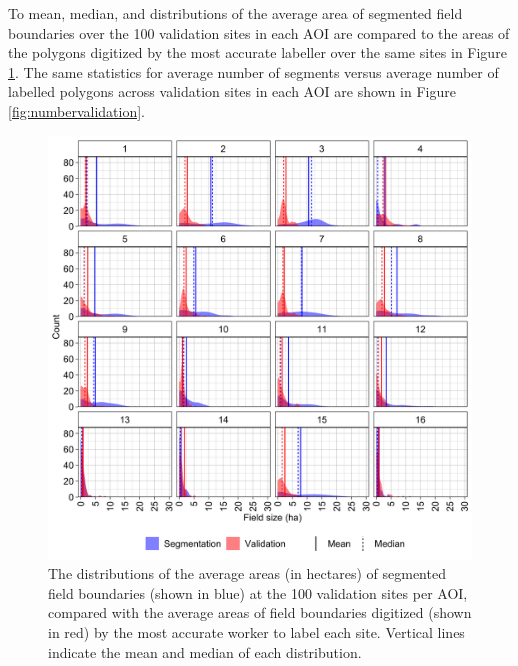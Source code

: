 \documentclass[
  11pt,
  a4paper]{article}
\begin{document}
To mean, median, and distributions of the average area of segmented
field boundaries over the 100 validation sites in each AOI are compared
to the areas of the polygons digitized by the most accurate labeller
over the same sites in Figure \ref{fig:areavalidation}. The same
statistics for average number of segments versus average number of
labelled polygons across validation sites in each AOI are shown in
Figure \ref{fig:numbervalidation}.\\

\begin{figure}[!ht]

{\centering \includegraphics[width=0.9\linewidth,]{figures/si_validation_stats_fha2} 

}

\caption{The distributions of the average areas (in hectares) of segmented field boundaries (shown in blue) at the 100 validation sites per AOI, compared with the average areas of field boundaries digitized (shown in red) by the most accurate worker to label each site. Vertical lines indicate the mean and median of each distribution.}\label{fig:areavalidation}
\end{figure}
\end{document}
